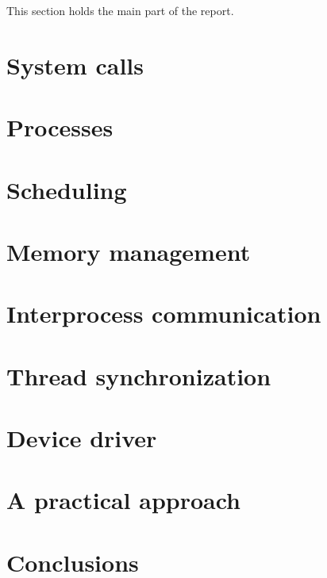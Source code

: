\documentclass{acm_proc_article-sp}
\begin{document}
This section holds the main part of the report.

\section{System calls}


\section{Processes}


\section{Scheduling}


\section{Memory management}


\section{Interprocess communication}


\section{Thread synchronization}


\section{Device driver}


\section{A practical approach}



\section{Conclusions}


%
\end{document}
